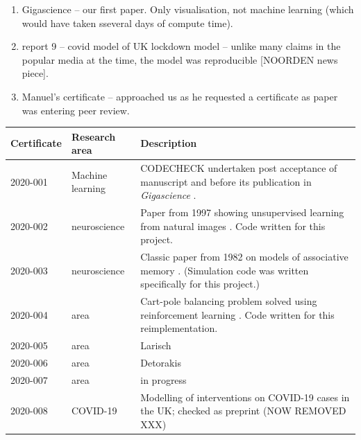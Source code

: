 \documentclass[12pt]{article}
\begin{document}
\begin{enumerate}
\def\labelenumi{\arabic{enumi}.}
\item
  Gigascience -- our first paper. Only visualisation, not machine
  learning (which would have taken sseveral days of compute time).
\item
  report 9 -- covid model of UK lockdown model -- unlike many claims
  in the popular media at the time, the model was reproducible
  [NOORDEN news piece]. 
\item
  Manuel's certificate -- approached us as he requested a certificate
  as paper was entering peer review.
\end{enumerate}

\begin{table}
  \centering

  \begin{tabular}{llp{11cm}}
    \toprule
    Certificate & Research area & Description \\ \midrule
    2020-001 \cite{cert-2020-001} &
    Machine learning & CODECHECK undertaken post acceptance of
    manuscript and before its publication in \textit{Gigascience}
    \cite{Piccolo2020-lo}. \\
    2020-002  \cite{cert-2020-002} & neuroscience & Paper from 1997
 showing unsupervised learning from natural images \cite{Hancock1992-mp}.
 Code written for this project. \\
    2020-003  \cite{cert-2020-003} & neuroscience &  Classic paper
                                                     from 1982 on
                                                     models of
                                                     associative
                                                     memory
                                                     \cite{Hopfield1982-mz}.
    (Simulation code was written specifically for this project.)\\
    2020-004  \cite{cert-2020-004} & area & Cart-pole balancing problem solved using reinforcement learning \cite{Barto1983-rg}.  Code written for this reimplementation.\\
    2020-005  \cite{cert-2020-005} & area & Larisch \\
    2020-006  \cite{cert-2020-006} & area & Detorakis \\
    2020-007  \cite{cert-2020-007} & area & in progress \\
    2020-008  \cite{cert-2020-008} & COVID-19 & Modelling of
    interventions on COVID-19 cases in the UK; checked as preprint (NOW REMOVED XXX)

\end{tabular}
\end{table}
\end{document}
